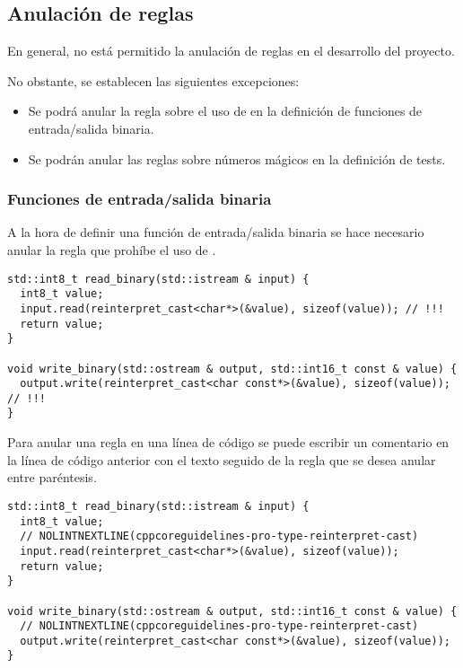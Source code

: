 \subsection{Anulación de reglas}

En general, no está permitido la anulación de reglas en el desarrollo
del proyecto.

No obstante, se establecen las siguientes excepciones:
\begin{itemize}

\item Se podrá anular la regla sobre el uso de 
      en la definición de funciones de entrada/salida binaria.

\item Se podrán anular las reglas sobre números mágicos 
      en la definición de tests.

\end{itemize}

\subsubsection{Funciones de entrada/salida binaria}

A la hora de definir una función de entrada/salida binaria se hace necesario
anular la regla que prohíbe el uso de .

\begin{lstlisting}
std::int8_t read_binary(std::istream & input) {
  int8_t value;
  input.read(reinterpret_cast<char*>(&value), sizeof(value)); // !!!
  return value;
}

void write_binary(std::ostream & output, std::int16_t const & value) {
  output.write(reinterpret_cast<char const*>(&value), sizeof(value)); // !!!
}
\end{lstlisting} 

Para anular una regla en una línea de código se puede escribir un comentario en
la línea de código anterior con el texto  seguido de la
regla que se desea anular entre paréntesis.

\begin{lstlisting}
std::int8_t read_binary(std::istream & input) {
  int8_t value;
  // NOLINTNEXTLINE(cppcoreguidelines-pro-type-reinterpret-cast)
  input.read(reinterpret_cast<char*>(&value), sizeof(value));
  return value;
}

void write_binary(std::ostream & output, std::int16_t const & value) {
  // NOLINTNEXTLINE(cppcoreguidelines-pro-type-reinterpret-cast)
  output.write(reinterpret_cast<char const*>(&value), sizeof(value));
}
\end{lstlisting} 

